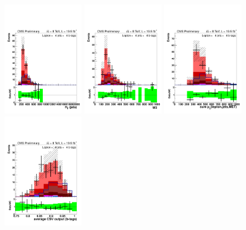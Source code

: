 \clearpage





\begin{figure}[hbtp]
 \begin{center}
   \includegraphics[width=0.31\textwidth]{Figures/Analysis_2_Diagrams/LJ_plots_lep/4j4t/lep_HT_4j4t_cumulative_wRatio_noLegend_lin.pdf}
   \includegraphics[width=0.31\textwidth]{Figures/Analysis_2_Diagrams/LJ_plots_lep/4j4t/lep_M3_4j4t_cumulative_wRatio_noLegend_lin.pdf}
   \includegraphics[width=0.31\textwidth]{Figures/Analysis_2_Diagrams/LJ_plots_lep/4j4t/lep_all_sum_pt_with_met_4j4t_cumulative_wRatio_noLegend_lin.pdf}
   \includegraphics[width=0.31\textwidth]{Figures/Analysis_2_Diagrams/LJ_plots_lep/4j4t/lep_avg_btag_disc_btags_4j4t_cumulative_wRatio_noLegend_lin.pdf}

\end{center}
\end{figure}
